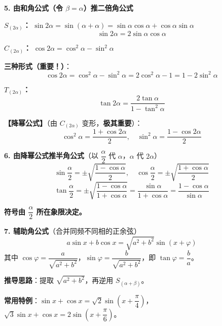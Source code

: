\documentclass[UTF8,10pt,aspectratio=169]{ctexbeamer}
\begin{document}
	\begin{frame}
		\textbf{5. 由和角公式（令 $\beta = \alpha$）推二倍角公式}
		
		\vspace{0.3cm}
		\textbf{$S_{(2\alpha)}$：} $\sin 2\alpha = \sin(\alpha+\alpha) = \sin\alpha\cos\alpha + \cos\alpha\sin\alpha$
		$$\boxed{\sin 2\alpha = 2\sin\alpha\cos\alpha}$$
		
		\vspace{0.2cm}
		\textbf{$C_{(2\alpha)}$：} $\cos 2\alpha = \cos^2\alpha - \sin^2\alpha$
		
		\vspace{0.1cm}
		\textbf{三种形式（重要！）}：
		$$\boxed{\cos 2\alpha = \cos^2\alpha - \sin^2\alpha = 2\cos^2\alpha - 1 = 1 - 2\sin^2\alpha}$$
		
		\vspace{0.2cm}
		\textbf{$T_{(2\alpha)}$：}
		$$\boxed{\tan 2\alpha = \dfrac{2\tan\alpha}{1 - \tan^2\alpha}}$$
		
		\pause
		\vspace{0.2cm}
		\textbf{【降幂公式】}（由 $C_{(2\alpha)}$ 变形，\textbf{极其重要}）：
		$$\boxed{\cos^2\alpha = \dfrac{1 + \cos 2\alpha}{2}, \quad \sin^2\alpha = \dfrac{1 - \cos 2\alpha}{2}}$$
	\end{frame}
	
	\begin{frame}
		\textbf{6. 由降幂公式推半角公式}（以 $\dfrac{\alpha}{2}$ 代 $\alpha$，$\alpha$ 代 $2\alpha$）
		$$\sin\dfrac{\alpha}{2} = \pm\sqrt{\dfrac{1-\cos\alpha}{2}}, \quad \cos\dfrac{\alpha}{2} = \pm\sqrt{\dfrac{1+\cos\alpha}{2}}$$
		$$\tan\dfrac{\alpha}{2} = \pm\sqrt{\dfrac{1-\cos\alpha}{1+\cos\alpha}} = \dfrac{\sin\alpha}{1+\cos\alpha} = \dfrac{1-\cos\alpha}{\sin\alpha}$$
		
		\textbf{符号由 $\dfrac{\alpha}{2}$ 所在象限决定。}
		
		\pause
		\vspace{0.3cm}
		\textbf{7. 辅助角公式}（合并同频不同相的正余弦）
		$$a\sin x + b\cos x = \sqrt{a^2+b^2}\sin(x+\varphi)$$
		其中 $\cos\varphi = \dfrac{a}{\sqrt{a^2+b^2}}$，$\sin\varphi = \dfrac{b}{\sqrt{a^2+b^2}}$，即 $\tan\varphi = \dfrac{b}{a}$。
		
		\vspace{0.2cm}
		\textbf{推导思路}：提取 $\sqrt{a^2+b^2}$，再逆用 $S_{(\alpha+\beta)}$。
		
		\vspace{0.2cm}
		\textbf{常用特例}：$\sin x + \cos x = \sqrt{2}\sin(x + \dfrac{\pi}{4})$，\quad $\sqrt{3}\sin x + \cos x = 2\sin(x + \dfrac{\pi}{6})$。
	\end{frame}
	
\end{document}
